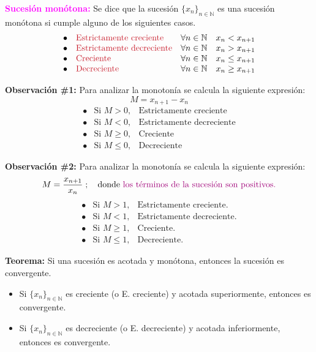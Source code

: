\documentclass[11pt,a4paper]{article}
\newcommand{\hl}[1]{\textcolor{resaltado}{#1}}
\begin{document}
\textcolor{magenta}{\textbf{Sucesión monótona:}} Se dice que la sucesión
$\{x_n\}_{n\in\mathbb{N}}$ es una sucesión monótona si cumple alguno de los siguientes casos.
\[
\begin{array}{lll}
\bullet & \textcolor{rojo}{\text{Estrictamente creciente}} & \forall n \in \mathbb{N}\quad x_n < x_{n+1}\\
\bullet & \textcolor{rojo}{\text{Estrictamente decreciente}} & \forall n \in \mathbb{N}\quad x_n > x_{n+1}\\
\bullet & \textcolor{rojo}{\text{Creciente}} & \forall n \in \mathbb{N}\quad x_n \leq x_{n+1}\\
\bullet & \textcolor{rojo}{\text{Decreciente}} & \forall n \in \mathbb{N}\quad x_n \geq x_{n+1}
\end{array}
\]

\textbf{Observación \#1:} Para analizar la monotonía se calcula la siguiente expresión:
\[M = x_{n+1} - x_n\]
\[
\begin{array}{lll}
\bullet & \text{Si } M > 0, & \text{Estrictamente creciente}\\
\bullet & \text{Si } M < 0, & \text{Estrictamente decreciente}\\
\bullet & \text{Si } M \geq 0, & \text{Creciente}\\
\bullet & \text{Si } M \leq 0, & \text{Decreciente}
\end{array}
\]

\textbf{Observación \#2:} Para analizar la monotonía se calcula la siguiente expresión:
\[M = \frac{x_{n+1}}{x_n}\;; \quad \text{donde \hl{los términos de la sucesión son positivos.}}\]
\[
\begin{array}{lll}
\bullet & \text{Si } M > 1, & \text{Estrictamente creciente.}\\
\bullet & \text{Si } M < 1, & \text{Estrictamente decreciente.}\\
\bullet & \text{Si } M \geq 1, & \text{Creciente.}\\
\bullet & \text{Si } M \leq 1, & \text{Decreciente.}
\end{array}
\]

\textbf{Teorema:} Si una sucesión es acotada y monótona, entonces la sucesión es convergente.
\begin{itemize}
  \item Si $\{x_n\}_{n\in\mathbb{N}}$ es creciente (o E. creciente) y acotada superiormente,
  entonces es convergente.
  \item Si $\{x_n\}_{n\in\mathbb{N}}$ es decreciente (o E. decreciente) y acotada
  inferiormente, entonces es convergente.
\end{itemize}
\end{document}
